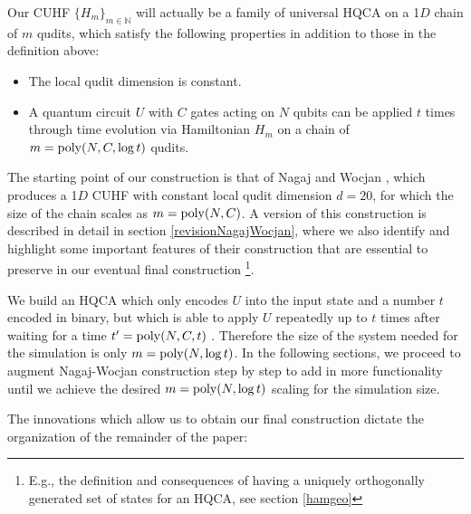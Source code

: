 \documentclass[11pt,letterpaper]{article}
\newcommand{\<}{\langle}
\renewcommand{\>}{\rangle}
\begin{document}
Our CUHF $\{H_m\}_{m\in\mathbb{N}}$ will actually be a family of universal HQCA on a 1$D$ chain of $m$ qudits, which satisfy the following properties in addition to those in the definition above:
\begin{itemize}
	\item The local qudit dimension is constant.
	\item A quantum circuit $U$ with $C$ gates acting on $N$ qubits can be applied $t$ times through time evolution via Hamiltonian $H_m$ on a chain of $m={\rm{poly}}(N,C,\log{t})$ qudits.
\end{itemize}
The starting point of our construction is that of Nagaj and Wocjan \cite{NW}, which produces a 1$D$ CUHF with constant local qudit dimension $d=20$, for which the size of the chain scales as $m={\rm{poly}}(N,C)$. A version of this construction is described in detail in section \ref{revisionNagajWocjan}, where we also identify and highlight some important features of their construction that are essential to preserve in our eventual final construction \footnote{E.g., the definition and consequences of having a uniquely orthogonally generated set of states for an HQCA, see section \ref{hamgeo}}.

We build an HQCA which only encodes $U$ into the input state and a number $t$ encoded in binary, but which is able to apply $U$ repeatedly up to $t$ times after waiting for a time $t'={\rm{poly}}(N, C, t)$ \cite{elizabeth}. Therefore the size of the system needed for the simulation is only $m={\rm{poly}}(N,\log{t})$. In the following sections, we proceed to augment Nagaj-Wocjan construction  \cite{NW} step by step to add in more functionality until we achieve the desired $m={\rm{poly}}(N,\log{t})$ scaling for the simulation size.

The innovations which allow us to obtain our final construction dictate the organization of the remainder of the paper:
\end{document}
